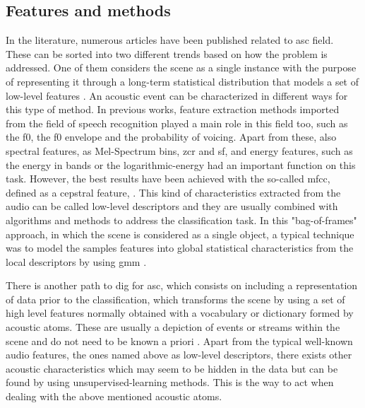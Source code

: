 	

\subsection{Features and methods}
\label{subsection:features-and-methods}


	
	In the literature, numerous articles have been published related to \acrshort{asc} field. These can be sorted into two different trends based on how the problem is addressed. One of them considers the scene as a single instance with the purpose of representing it through a long-term statistical distribution that models a set of low-level features \cite{Stowell2015}. An acoustic event can be characterized in different ways for this type of method. In previous works, feature extraction methods imported from the field of speech recognition played a main role in this field too, such as the \acrfull{f0}, the \acrshort{f0} envelope and the probability of voicing. Apart from these, also spectral features, as Mel-Spectrum bins, \acrfull{zcr} and \acrfull{sf}, and energy features, such as the energy in bands or the logarithmic-energy \cite{Geiger2013} had an important function on this task. However, the best results have been achieved with the so-called  \acrfull{mfcc}, defined as a cepstral feature, . This kind of characteristics extracted from the audio can be called low-level descriptors and they are usually combined with algorithms and methods to address the classification task. In this "bag-of-frames" approach, in which the scene is considered as a single object, a typical technique was to model the samples features into global statistical characteristics from the local descriptors by using \acrfull{gmm} \cite{Aucouturier2007}. 
	
	There is another path to dig for \acrlong{asc}, which consists on including a representation of data prior to the classification, which transforms the scene by using a set of high level features normally obtained with a vocabulary or dictionary formed by acoustic atoms. These are usually a depiction of events or streams within the scene and do not need to be known a priori \cite{Stowell2015}. Apart from the typical well-known audio features, the ones named above as low-level descriptors, there exists other acoustic characteristics which may seem to be hidden in the data but can be found by using unsupervised-learning methods. This is the way to act when dealing with the above mentioned acoustic atoms. 
	
